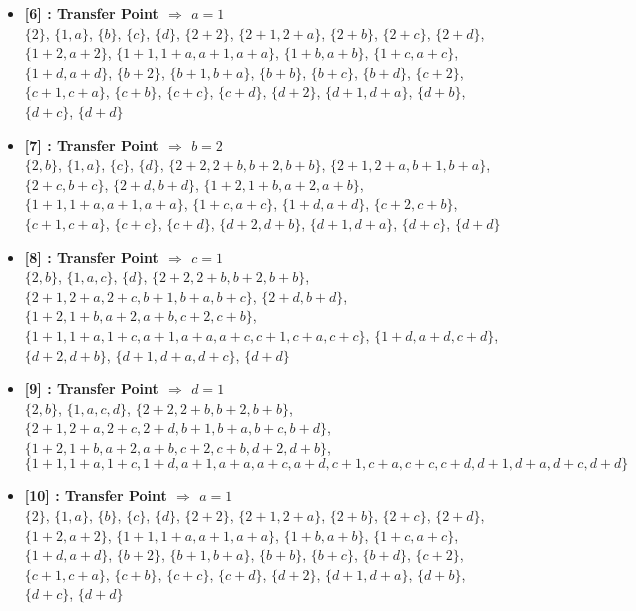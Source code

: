 \begin{itemize}
    \item \textbf{[6] : Transfer Point $\Rightarrow$ $a = 1$}\\
        $\{2\}$, $\{1, a\}$, $\{b\}$, $\{c\}$, $\{d\}$, $\{2 + 2\}$, $\{2 + 1, 2 + a\}$, $\{2 + b\}$, $\{2 + c\}$, $\{2 + d\}$, $\{1 + 2, a + 2\}$, $\{1 + 1, 1 + a, a + 1, a + a\}$, $\{1 + b, a + b\}$, $\{1 + c, a + c\}$, $\{1 + d, a + d\}$, $\{b + 2\}$, $\{b + 1, b + a\}$, $\{b + b\}$, $\{b + c\}$, $\{b + d\}$, $\{c + 2\}$, $\{c + 1, c + a\}$, $\{c + b\}$, $\{c + c\}$, $\{c + d\}$, $\{d + 2\}$, $\{d + 1, d + a\}$, $\{d + b\}$, $\{d + c\}$, $\{d + d\}$

    \item \textbf{[7] : Transfer Point $\Rightarrow$ $b = 2$}\\
        $\{2, b\}$, $\{1, a\}$, $\{c\}$, $\{d\}$, $\{2 + 2, 2 + b, b + 2, b + b\}$, $\{2 + 1, 2 + a, b + 1, b + a\}$, $\{2 + c, b + c\}$, $\{2 + d, b + d\}$, $\{1 + 2, 1 + b, a + 2, a + b\}$, $\{1 + 1, 1 + a, a + 1, a + a\}$, $\{1 + c, a + c\}$, $\{1 + d, a + d\}$, $\{c + 2, c + b\}$, $\{c + 1, c + a\}$, $\{c + c\}$, $\{c + d\}$, $\{d + 2, d + b\}$, $\{d + 1, d + a\}$, $\{d + c\}$, $\{d + d\}$

    \item \textbf{[8] : Transfer Point $\Rightarrow$ $c = 1$}\\
        $\{2, b\}$, $\{1, a, c\}$, $\{d\}$, $\{2 + 2, 2 + b, b + 2, b + b\}$, $\{2 + 1, 2 + a, 2 + c, b + 1, b + a, b + c\}$, $\{2 + d, b + d\}$, $\{1 + 2, 1 + b, a + 2, a + b, c + 2, c + b\}$, $\{1 + 1, 1 + a, 1 + c, a + 1, a + a, a + c, c + 1, c + a, c + c\}$, $\{1 + d, a + d, c + d\}$, $\{d + 2, d + b\}$, $\{d + 1, d + a, d + c\}$, $\{d + d\}$

    \item \textbf{[9] : Transfer Point $\Rightarrow$ $d = 1$}\\
        $\{2, b\}$, $\{1, a, c, d\}$, $\{2 + 2, 2 + b, b + 2, b + b\}$, $\{2 + 1, 2 + a, 2 + c, 2 + d, b + 1, b + a, b + c, b + d\}$, $\{1 + 2, 1 + b, a + 2, a + b, c + 2, c + b, d + 2, d + b\}$, $\{1 + 1, 1 + a, 1 + c, 1 + d, a + 1, a + a, a + c, a + d, c + 1, c + a, c + c, c + d, d + 1, d + a, d + c, d + d\}$

    \item \textbf{[10] : Transfer Point $\Rightarrow$ $a = 1$}\\
        $\{2\}$, $\{1, a\}$, $\{b\}$, $\{c\}$, $\{d\}$, $\{2 + 2\}$, $\{2 + 1, 2 + a\}$, $\{2 + b\}$, $\{2 + c\}$, $\{2 + d\}$, $\{1 + 2, a + 2\}$, $\{1 + 1, 1 + a, a + 1, a + a\}$, $\{1 + b, a + b\}$, $\{1 + c, a + c\}$, $\{1 + d, a + d\}$, $\{b + 2\}$, $\{b + 1, b + a\}$, $\{b + b\}$, $\{b + c\}$, $\{b + d\}$, $\{c + 2\}$, $\{c + 1, c + a\}$, $\{c + b\}$, $\{c + c\}$, $\{c + d\}$, $\{d + 2\}$, $\{d + 1, d + a\}$, $\{d + b\}$, $\{d + c\}$, $\{d + d\}$


\end{itemize}
